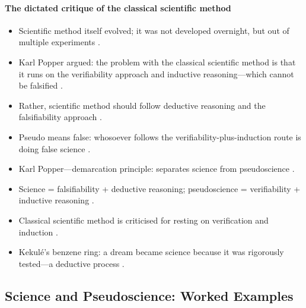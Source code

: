 \paragraph{The dictated critique of the classical scientific method}
\begin{itemize}
    \item Scientific method itself evolved; it was not developed overnight, but out of multiple experiments .
    \item Karl Popper argued: the problem with the classical scientific method is that it runs on the verifiability approach and inductive reasoning---which cannot be falsified .
    \item Rather, scientific method should follow deductive reasoning and the falsifiability approach .
    \item Pseudo means false: whosoever follows the verifiability-plus-induction route is doing false science .
\end{itemize}

\begin{QuickRevision}
\begin{itemize}
    \item Karl Popper---demarcation principle: separates science from pseudoscience .
    \item Science = falsifiability + deductive reasoning; pseudoscience = verifiability + inductive reasoning .
    \item Classical scientific method is criticised for resting on verification and induction .
    \item Kekulé's benzene ring: a dream became science because it was rigorously tested---a deductive process .
\end{itemize}
\end{QuickRevision}

\subsection{Science and Pseudoscience: Worked Examples}

